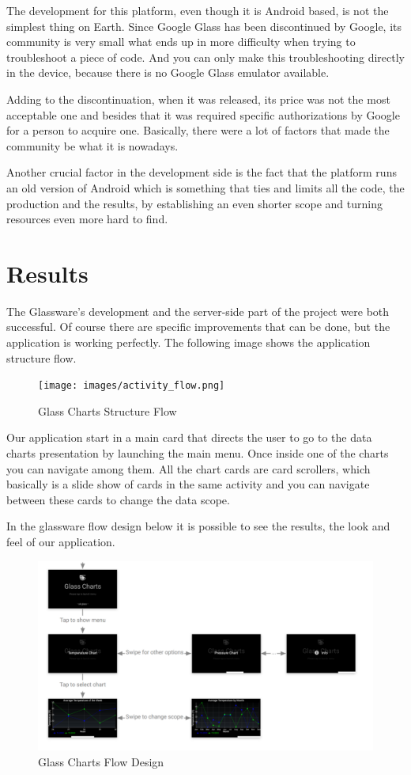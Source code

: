 \documentclass[a4paper,11pt]{article}
\begin{document}
The development for this platform, even though it is Android based, is not the simplest thing on Earth. Since Google Glass has been discontinued by Google, its community is very small what ends up in more difficulty when trying to troubleshoot a piece of code. And you can only make this troubleshooting directly in the device, because there is no Google Glass emulator available. 

Adding to the discontinuation, when it was released, its price was not the most acceptable one and besides that it was required specific authorizations by Google for a person to acquire one. Basically, there were a lot of factors that made the community be what it is nowadays.

Another crucial factor in the development side is the fact that the platform runs an old version of Android which is something that ties and limits all the code, the production and the results, by establishing an even shorter scope and turning resources even more hard to find.

\section{Results}

The Glassware’s development and the server-side part of the project were both successful. Of course there are specific improvements that can be done, but the application is working perfectly. The following image shows the application structure flow.

\begin{figure}[H]
\centering
\texttt{[image: images/activity\_flow.png]}
\caption{Glass Charts Structure Flow}
\label{glassstructureflow}
\end{figure}

Our application start in a main card that directs the user to go to the data charts presentation by launching the main menu. Once inside one of the charts you can navigate among them. All the chart cards are card scrollers, which basically is a slide show of cards in the same activity and you can navigate between these cards to change the data scope.

In the glassware flow design below it is possible to see the results, the look and feel of our application. 

\begin{figure}[H]
\centering
\includegraphics[width = 0.7\linewidth]{images/project_card_flow.png}
\caption{Glass Charts Flow Design}
\label{glassflowdesign}
\end{figure}
\end{document}
